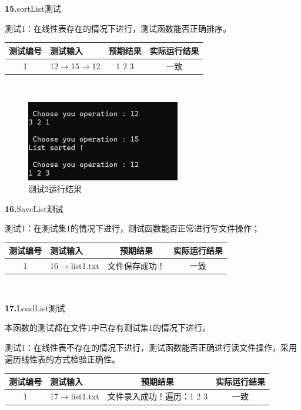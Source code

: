 \documentclass[supercite]{Experimental_Report}
\theoremstyle{definition}
\begin{document}
\noindent\textbf{15.}sortList测试

测试1：在线性表存在的情况下进行，测试函数能否正确排序。

\vspace{0.5em}

\begin{tabular}{|c|p{2.7cm}|c|c|}
	\hline
	测试编号 & 测试输入 & 预期结果 & 实际运行结果 \\
	\hline
	1 & 12$\rightarrow$15$\rightarrow$12 & 1 2 3 & 一致 \\
	\hline
\end{tabular}

~\

 \begin{figure}[H]
 	\centering
 	\includegraphics[width=0.6\textwidth]{images/线性表测试15.png}
 	\caption{测试2运行结果}
 	\label{txlab}
 \end{figure}


\noindent\textbf{16.}SaveList测试
	
测试1：在测试集1的情况下进行，测试函数能否正常进行写文件操作；

\vspace{0.5em}

\begin{tabular}{|c|p{2.7cm}|c|c|}
	\hline
	测试编号 & 测试输入 & 预期结果 & 实际运行结果 \\
	\hline
	1 & 16$\rightarrow$list1.txt & 文件保存成功！ & 一致 \\
	\hline
\end{tabular}

~\

\noindent\textbf{17.}LoadList测试
	
本函数的测试都在文件1中已存有测试集1的情况下进行。

测试1：在线性表不存在的情况下进行，测试函数能否正确进行读文件操作，采用遍历线性表的方式检验正确性。

\vspace{0.5em}

\begin{tabular}{|c|p{2.7cm}|c|c|}
	\hline
	测试编号 & 测试输入 & 预期结果 & 实际运行结果 \\
	\hline
	1 & 17$\rightarrow$list1.txt & 文件录入成功！遍历：1 2 3 & 一致 \\
	\hline
\end{tabular}
\end{document}
